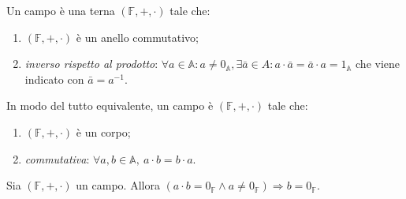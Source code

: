 \begin{definition}[campo]
	Un campo è una terna $ (\mathbb{F}, + , \cdot) $ tale che:
	\begin{enumerate}
		\item $ (\mathbb{F}, +, \cdot) $ è un anello commutativo;
		\item \emph{inverso rispetto al prodotto}: $ \forall a \in \mathbb{A}: a \neq 0_{\mathbb{A}}, \exists \bar{a} \in A : a \cdot \bar{a} = \bar{a} \cdot a = 1_{\mathbb{A}} $ che viene indicato con $ \bar{a} = a^{-1} $.
	\end{enumerate}
	In modo del tutto equivalente, un campo è $ (\mathbb{F}, + , \cdot) $ tale che:
	\begin{enumerate}
		\item $ (\mathbb{F}, +, \cdot) $ è un corpo;
		\item \emph{commutativa}: $ \forall a, b \in \mathbb{A}, \ a \cdot b = b \cdot a $.
	\end{enumerate}
\end{definition}

\begin{prop}
	Sia $ (\mathbb{F}, + , \cdot) $ un campo. Allora $ (a \cdot b = 0_{\mathbb{F}} \wedge a \neq 0_{\mathbb{F}}) \Rightarrow b = 0_{\mathbb{F}} $.
\end{prop}